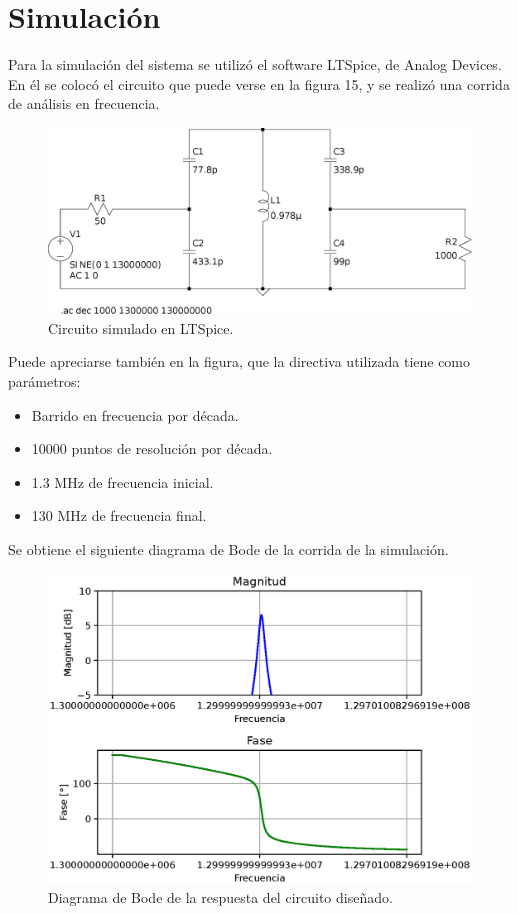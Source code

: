 \documentclass{article}
\begin{document}
\newpage
\section{Simulación}
Para la simulación del sistema se utilizó el software LTSpice, de Analog Devices. En él se colocó el circuito que puede verse en la figura 15, y se realizó una corrida de análisis en frecuencia. 
\begin{figure}[H]
\centering
\includegraphics[width=1\textwidth]{./img/figura15.eps}
\caption{Circuito simulado en LTSpice.}
\label{fig:circuito15}
\end{figure}
\noindent Puede apreciarse también en la figura, que la directiva utilizada tiene como parámetros:
\begin{itemize}
\item Barrido en frecuencia por década.
\item 10000 puntos de resolución por década.
\item 1.3 MHz de frecuencia inicial.
\item 130 MHz de frecuencia final.
\end{itemize}
\noindent Se obtiene el siguiente diagrama de Bode de la corrida de la simulación.
\begin{figure}[H]
\centering
\includegraphics[width=1\textwidth]{./img/figura16.eps}
\caption{Diagrama de Bode de la respuesta del circuito diseñado.}
\label{fig:circuito16}
\end{figure}
\end{document}

